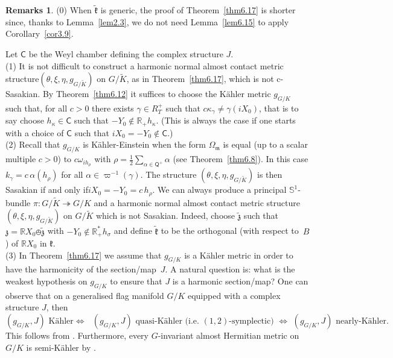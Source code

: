 \documentclass[a4paper,reqno]{amsart}
\theoremstyle{definition}
\newtheorem{rems}[thm]{Remarks}
\theoremstyle{remark}
\theoremstyle{plain}
\numberwithin{equation}{section}
\newcommand{\R}{{\mathbb{R}}}
\newcommand{\bbS}{{\mathbb{S}}}
\newcommand{\fm}{{\mathfrak{m}}}
\newcommand{\fk}{{\mathfrak{k}}}  \renewcommand{\k}{{\mathfrak{k}}}
\newcommand{\fz}{{\mathfrak{z}}}
\newcommand{\sto}{\twoheadrightarrow}
\newcommand{\prootsQ}{\mathsf{Q}^+}
\newcommand{\Kt}{{\widetilde{K}}}
\newcommand{\wK}{{\widetilde{K}}}
\newcommand{\wk}{{\widetilde{\mathfrak{k}}}}
\newcommand{\wz}{{\widetilde{\mathfrak{z}}}}
\newcommand{\half}{{\frac{1}{2}}}
\newcommand{\kahler}{K\"ahler\xspace}
\newcommand{\sissi}{if and only if\xspace}
\newcommand{\NACMS}{normal almost contact metric
  structure\xspace}
\newcommand{\txeMK}{{(\theta,\xi,\eta,g_{\scriptscriptstyle{G/\wK}})}}
\begin{document}
\begin{rems}
  \label{rem6.18}
  (0) When $\wk$ is generic, the proof of Theorem~\ref{thm6.17}
  is shorter since, thanks to Lemma~\ref{lem2.3}, we do not need
  Lemma~\ref{lem6.15} to apply Corollary~\ref{cor3.9}.
  
  Let $\mathsf{C}$ be the Weyl chamber defining the
  complex structure $J$.
  \\
\noindent   (1) It is not difficult to construct a harmonic \NACMS $\txeMK$
  on $G/\Kt$, as in Theorem~\ref{thm6.17}, which is not
  c-Sasakian.  By Theorem~\ref{thm6.12} it suffices to choose the
  \kahler metric $g_{\scriptscriptstyle{G/K}}$ such that, for all $c >0$ there exists
  $\gamma \in R_T^+$ such that $c\kappa_\gamma \neq
  \gamma(iX_0)$, that is to say choose  $h_\kappa \in
  \mathsf{C}$ such that $-Y_0 \notin \R_+ h_\kappa$.  (This is
  always the case if one starts with a choice of $\mathsf{C}$
  such that
   $iX_0=-Y_0 \notin \mathsf{C}$.)
  \\
  (2) Recall that $g_{\scriptscriptstyle{G/K}}$ is \kahler-Einstein when the form
  $\Omega_\fm$ is equal (up to a scalar multiple $c >0$)
  to $c\omega_{ih_\rho}$ with
  $\rho = \half\sum_{\alpha \in \prootsQ} \alpha$ (see
  Theorem~\ref{thm6.8}). In this case
  $k_\gamma = c\, \alpha(h_\rho)$ for all
  $\alpha \in \varpi^{-1}(\gamma)$. The structure $\txeMK$ is then
  Sasakian \sissi $iX_0=-Y_0= c \, h_\rho$. We can always
  produce a principal $\bbS^1$-bundle $\pi : G/\wK \sto G/K$ and a
  harmonic \NACMS $\txeMK$ on $G/\wK$ which is not Sasakian.
  Indeed, choose $\wz$ such that $\fz= \R X_0 \obot \wz$ with
  $-Y_0 \notin \R_+^* h_{\sigma}$ and define $\wk$ to be the
  orthogonal (with respect to~$B$) of $\R X_0$ in $\fk$.
  \\
  (3) In Theorem~\ref{thm6.17} we assume that $g_{\scriptscriptstyle{G/K}}$ is a
  \kahler metric in order to have the harmonicity of the
  section/map~$J$. A natural question is: what is the weakest
  hypothesis on $g_{\scriptscriptstyle{G/K}}$ to ensure that   $J$ is a
  harmonic section/map? One can observe that on a generalised flag manifold
$G/K$  equipped  with a complex structure $J$, then
\[
\text{$(g_{\scriptscriptstyle{G/K}},J)$ \kahler $\iff$ $(g_{\scriptscriptstyle{G/K}},J)$ quasi-\kahler
  (i.e.~$(1,2)$-symplectic) $\iff$
  $(g_{\scriptscriptstyle{G/K}},J)$ nearly-\kahler.} 
\]
This follows from \cite[Theorem~9.15 \&
Theorem~9.17]{WG}. Furthermore, every $G$-invariant almost
Hermitian metric on $G/K$ is semi-\kahler by
\cite[Theorem~8.9~(ii)]{WG}. 
\end{rems}
\end{document}
